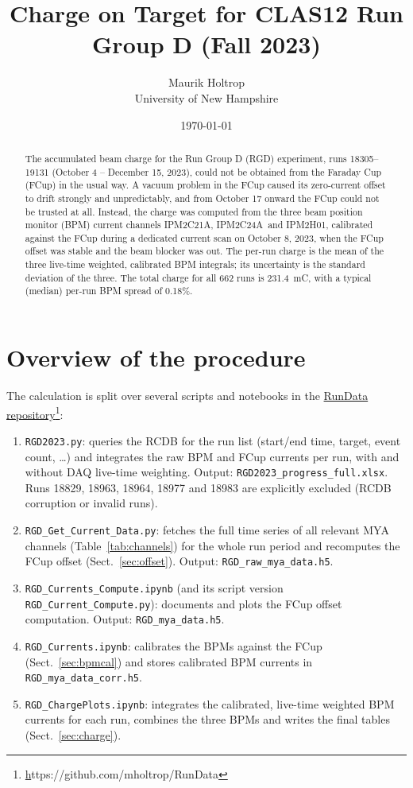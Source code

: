 \documentclass[11pt]{article}
\title{Charge on Target for CLAS12 Run Group D (Fall 2023)}
\author{Maurik Holtrop\\University of New Hampshire}
\date{\today}
\newcommand{\code}[1]{\texttt{#1}}
\newcommand{\IC}{IPM2C21A}
\newcommand{\ID}{IPM2C24A}
\newcommand{\IH}{IPM2H01}
\begin{document}
\maketitle
\begin{abstract}
The accumulated beam charge for the Run Group D (RGD) experiment, runs 18305--19131
(October 4 -- December 15, 2023), could not be obtained from the Faraday Cup (FCup) in the usual way.
A vacuum problem in the FCup caused its zero-current offset to drift strongly and
unpredictably, and from October 17 onward the FCup could not be trusted at all. Instead, the charge
was computed from the three beam position monitor (BPM) current channels \IC, \ID\ and \IH,
calibrated against the FCup during a dedicated current scan on October 8, 2023, when the FCup offset
was stable and the beam blocker was out. The per-run charge is the mean of the three live-time
weighted, calibrated BPM integrals; its uncertainty is the standard deviation of the three.
The total charge for all 662 runs is \SI{231.4}{\milli\coulomb}, with a typical (median) per-run
BPM spread of 0.18\%.
\end{abstract}

\section{Overview of the procedure}
The calculation is split over several scripts and notebooks in the
\href{https://github.com/mholtrop/RunData}{RunData repository}\footnote{\href{https://github.com/mholtrop/RunData} https://github.com/mholtrop/RunData}:
\begin{enumerate}
  \item \code{RGD2023.py}: queries the RCDB for the run list (start/end time, target, event count, \dots)
        and integrates the raw BPM and FCup currents per run, with and without DAQ live-time weighting.
        Output: \code{RGD2023\_progress\_full.xlsx}. Runs 18829, 18963, 18964, 18977 and 18983
        are explicitly excluded (RCDB corruption or invalid runs).
  \item \code{RGD\_Get\_Current\_Data.py}: fetches the full time series of all relevant MYA channels
        (Table~\ref{tab:channels}) for the whole run period and recomputes the FCup offset
        (Sect.~\ref{sec:offset}). Output: \code{RGD\_raw\_mya\_data.h5}.
  \item \code{RGD\_Currents\_Compute.ipynb} (and its script version \code{RGD\_Current\_Compute.py}):
        documents and plots the FCup offset computation. Output: \code{RGD\_mya\_data.h5}.
  \item \code{RGD\_Currents.ipynb}: calibrates the BPMs against the FCup (Sect.~\ref{sec:bpmcal})
        and stores calibrated BPM currents in \code{RGD\_mya\_data\_corr.h5}.
  \item \code{RGD\_ChargePlots.ipynb}: integrates the calibrated, live-time weighted BPM currents
        for each run, combines the three BPMs and writes the final tables (Sect.~\ref{sec:charge}).
\end{enumerate}
\end{document}

